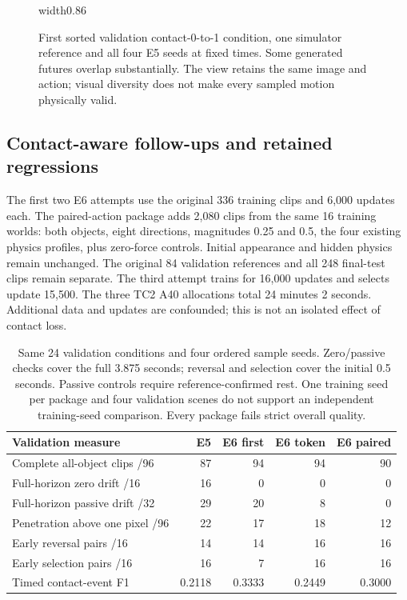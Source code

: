 \documentclass[11pt,a4paper]{article}
\begin{document}
\begin{figure}[!ht]
\centering
\pdfximage width0.86\linewidth{report/figures/trajectory_contact.png}\pdfrefximage\pdflastximage
\caption{First sorted validation contact-0-to-1 condition, one simulator reference and all four E5 seeds at fixed times. Some generated futures overlap substantially. The view retains the same image and action; visual diversity does not make every sampled motion physically valid.}
\label{fig:contact}
\end{figure}

\clearpage
\subsection{Contact-aware follow-ups and retained regressions}
The first two E6 attempts use the original 336 training clips and 6,000 updates each. The paired-action package adds 2,080 clips from the same 16 training worlds: both objects, eight directions, magnitudes 0.25 and 0.5, the four existing physics profiles, plus zero-force controls. Initial appearance and hidden physics remain unchanged. The original 84 validation references and all 248 final-test clips remain separate. The third attempt trains for 16,000 updates and selects update 15,500. The three TC2 A40 allocations total 24 minutes 2 seconds. Additional data and updates are confounded; this is not an isolated effect of contact loss.

\begin{table}[!ht]
\centering
\begin{tabular}{lrrrr}
\hline
Validation measure & E5 & E6 first & E6 token & E6 paired \\
\hline
Complete all-object clips /96 & 87 & 94 & 94 & 90 \\
Full-horizon zero drift /16 & 16 & 0 & 0 & 0 \\
Full-horizon passive drift /32 & 29 & 20 & 8 & 0 \\
Penetration above one pixel /96 & 22 & 17 & 18 & 12 \\
Early reversal pairs /16 & 14 & 14 & 16 & 16 \\
Early selection pairs /16 & 16 & 7 & 16 & 16 \\
Timed contact-event F1 & 0.2118 & 0.3333 & 0.2449 & 0.3000 \\
\hline
\end{tabular}
\caption{Same 24 validation conditions and four ordered sample seeds. Zero/passive checks cover the full 3.875 seconds; reversal and selection cover the initial 0.5 seconds. Passive controls require reference-confirmed rest. One training seed per package and four validation scenes do not support an independent training-seed comparison. Every package fails strict overall quality.}
\label{tab:contact_training}
\end{table}
\end{document}
